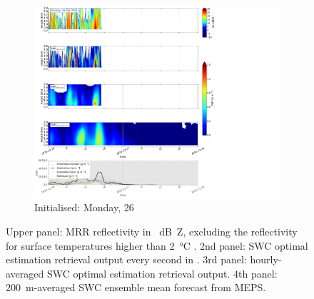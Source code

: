 \begin{figure}[t]\ContinuedFloat
	\centering
	\begin{subfigure}[t]{0.8\textwidth}
		\includegraphics[trim={2.3cm 17.6cm 27.cm 0.5cm},clip,width=\textwidth]{./fig_SWC/20161226}
		\caption{Initialised: Monday, \SI{26}{\dec}}\label{fig:SWC26}
	\end{subfigure}
	\caption{Upper panel: MRR reflectivity in \SI{}{\dB Z}, excluding the reflectivity for surface temperatures higher than \SI{2}{\celsius} . 2nd panel: SWC optimal estimation retrieval output every second in \SI{}{\SWC}. 3rd panel: hourly-averaged SWC optimal estimation retrieval output. 4th panel: \SI{200}{\metre}-averaged SWC ensemble mean forecast from MEPS. 
	}\label{fig:SWC}
\end{figure}
